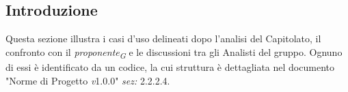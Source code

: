 \subsection{Introduzione}
Questa sezione illustra i casi d'uso delineati dopo l'analisi del Capitolato, il confronto con il \textit{proponente}\textsubscript{\textit{G}} e le discussioni tra gli Analisti del gruppo. Ognuno di essi è identificato da un codice, la cui struttura è dettagliata nel documento "Norme di Progetto \textit{v}1.0.0" \textit{sez:} 2.2.2.4.